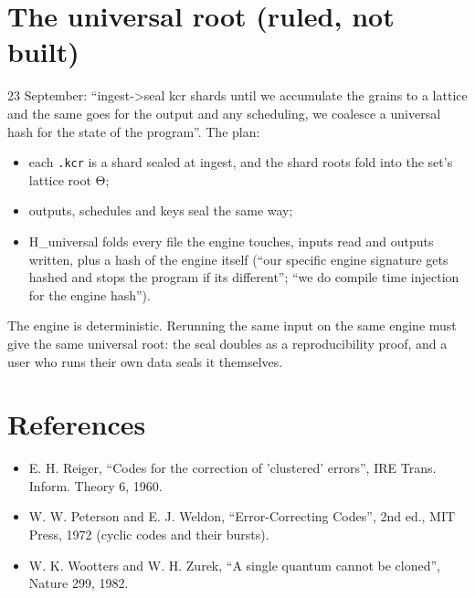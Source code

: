 \section{\texorpdfstring{The universal root (ruled, not built)}{The universal root (ruled, not built)}}

23 September: “ingest->seal kcr shards until we accumulate the grains to a lattice and the same goes for the output and any scheduling, we coalesce a universal hash for the state of the program”. The plan:

\begin{itemize}
\item each \texttt{.\allowbreak{}kcr} is a shard sealed at ingest, and the shard roots fold into the set's lattice root Θ;
\item outputs, schedules and keys seal the same way;
\item H\_\allowbreak{}universal folds every file the engine touches, inputs read and outputs written, plus a hash of the engine itself (“our specific engine signature gets hashed and stops the program if its different”; “we do compile time injection for the engine hash”).
\end{itemize}

The engine is deterministic. Rerunning the same input on the same engine must give the same universal root: the seal doubles as a reproducibility proof, and a user who runs their own data seals it themselves.

\section{\texorpdfstring{References}{References}}

\begin{itemize}
\item E. H. Reiger, “Codes for the correction of 'clustered' errors”, IRE Trans. Inform. Theory 6, 1960.
\item W. W. Peterson and E. J. Weldon, “Error-Correcting Codes”, 2nd ed., MIT Press, 1972 (cyclic codes and their bursts).
\item W. K. Wootters and W. H. Zurek, “A single quantum cannot be cloned”, Nature 299, 1982.
\end{itemize}
